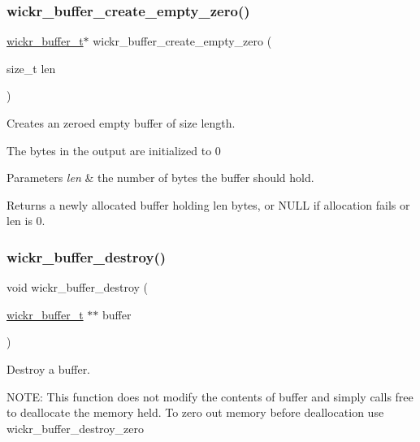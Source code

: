 \subsubsection{\texorpdfstring{wickr\_buffer\_create\_empty\_zero()}{wickr\_buffer\_create\_empty\_zero()}}
{\footnotesize\ttfamily \mbox{\hyperlink{structwickr__buffer}{wickr\+\_\+buffer\+\_\+t}}$\ast$ wickr\+\_\+buffer\+\_\+create\+\_\+empty\+\_\+zero (\begin{DoxyParamCaption}\item[{size\+\_\+t}]{len }\end{DoxyParamCaption})}



Creates an zeroed empty buffer of size length. 

The bytes in the output are initialized to 0


\begin{DoxyParams}{Parameters}
{\em len} & the number of bytes the buffer should hold. \\
\hline
\end{DoxyParams}
\begin{DoxyReturn}{Returns}
a newly allocated buffer holding len bytes, or N\+U\+LL if allocation fails or len is 0. 
\end{DoxyReturn}
\mbox{\label{group__wickr__buffer_ga7ec1198db0739f3034ddd3969c64257f}} 
\subsubsection{\texorpdfstring{wickr\_buffer\_destroy()}{wickr\_buffer\_destroy()}}
{\footnotesize\ttfamily void wickr\+\_\+buffer\+\_\+destroy (\begin{DoxyParamCaption}\item[{\mbox{\hyperlink{structwickr__buffer}{wickr\+\_\+buffer\+\_\+t}} $\ast$$\ast$}]{buffer }\end{DoxyParamCaption})}



Destroy a buffer. 

N\+O\+TE\+: This function does not modify the contents of buffer and simply calls free to deallocate the memory held. To zero out memory before deallocation use \textquotesingle{}wickr\+\_\+buffer\+\_\+destroy\+\_\+zero\textquotesingle{}


